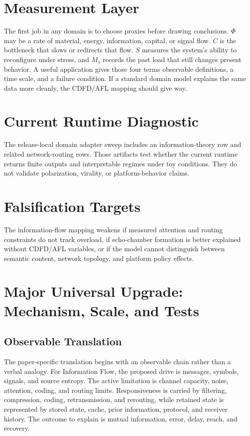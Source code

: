 \documentclass[12pt,a4paper]{article}
\begin{document}
\section{Measurement Layer}

The first job in any domain is to choose proxies before drawing conclusions. $\Phi$ may be a rate of material, energy, information, capital, or signal flow. $C$ is the bottleneck that slows or redirects that flow. $S$ measures the system's ability to reconfigure under stress, and $M_s$ records the past load that still changes present behavior. A useful application gives those four terms observable definitions, a time scale, and a failure condition. If a standard domain model explains the same data more cleanly, the CDFD/AFL mapping should give way.

\section{Current Runtime Diagnostic}

The release-local domain adapter sweep includes an information-theory row and
related network-routing rows. Those artifacts test whether the current runtime
returns finite outputs and interpretable regimes under toy conditions. They do
not validate polarization, virality, or platform-behavior claims.

\section{Falsification Targets}

The information-flow mapping weakens if measured attention and routing
constraints do not track overload, if echo-chamber formation is better explained
without CDFD/AFL variables, or if the model cannot distinguish between semantic
content, network topology, and platform policy effects.

\section{Major Universal Upgrade: Mechanism, Scale, and Tests}

\subsection{Observable Translation}

The paper-specific translation begins with an observable chain rather than a
verbal analogy. For Information Flow, the proposed drive is messages, symbols, signals, and source entropy.
The active limitation is channel capacity, noise, attention, coding, and routing limits. Responsiveness is carried by
filtering, compression, coding, retransmission, and rerouting, while retained state is represented by
stored state, cache, prior information, protocol, and receiver history. The outcome to explain is mutual information, error, delay, reach, and recovery.
\end{document}
